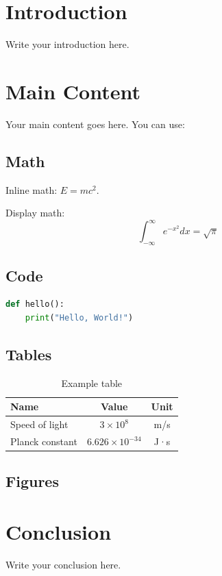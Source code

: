 \documentclass[12pt]{article}
\begin{document}
\makeblogtitle

\section{Introduction}

Write your introduction here.

\section{Main Content}

Your main content goes here. You can use:

\subsection{Math}

Inline math: $E = mc^2$.

Display math:
\[
  \int_{-\infty}^{\infty} e^{-x^2} dx = \sqrt{\pi}
\]

\subsection{Code}

\begin{lstlisting}[language=Python, caption={Example code}]
def hello():
    print("Hello, World!")
\end{lstlisting}

\subsection{Tables}

\begin{table}[H]
\centering
\caption{Example table}
\begin{tabular}{lcc}
\toprule
\textbf{Name} & \textbf{Value} & \textbf{Unit} \\
\midrule
Speed of light & $3 \times 10^8$ & m/s \\
Planck constant & $6.626 \times 10^{-34}$ & J·s \\
\bottomrule
\end{tabular}
\end{table}

\subsection{Figures}


\section{Conclusion}

Write your conclusion here.
\end{document}
